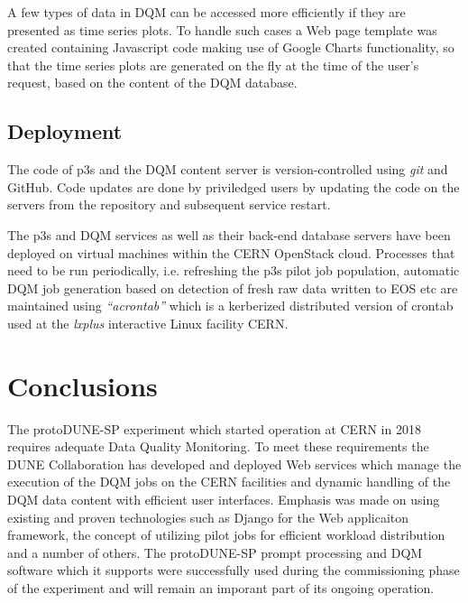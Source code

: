 \documentclass{webofc}
\newcommand{\pd}{protoDUNE\xspace}
\begin{document}
A few types of data in DQM can be accessed more efficiently if they are presented as time
series plots. To handle such cases a Web page template was created containing
Javascript code making use of Google Charts functionality, so that the time series
plots are generated on the fly at the time of the user's request, based on the content
of the DQM database.

\subsection{Deployment}

The code of p3s and the DQM content server is version-controlled using \textit{git}
and GitHub. Code updates are done by priviledged users by updating the code
on the servers from the repository and subsequent service restart.

The p3s and DQM services as well as their back-end database servers have been deployed on
virtual machines within the CERN OpenStack cloud. Processes that need to be run periodically,
i.e. refreshing the p3s pilot job population, automatic DQM job generation based on detection
of fresh raw data written to EOS etc are maintained using \textit{``acrontab''} which is a kerberized
distributed version of crontab used at the \textit{lxplus} interactive Linux facility CERN.

\section{Conclusions}

The \pd-SP experiment which started operation at CERN in 2018 requires adequate Data
Quality Monitoring. To meet these requirements the DUNE Collaboration has developed
and deployed Web services which manage the execution of the DQM jobs on the CERN
facilities and dynamic handling of the DQM data content with efficient user interfaces.
Emphasis was made on using existing and proven technologies such as Django
for the Web applicaiton framework, the concept of utilizing pilot jobs for
efficient workload distribution and a number of others. The \pd-SP prompt
processing and DQM software which it supports were successfully used during
the commissioning phase of the experiment and will remain an imporant part
of its ongoing operation.
\end{document}
